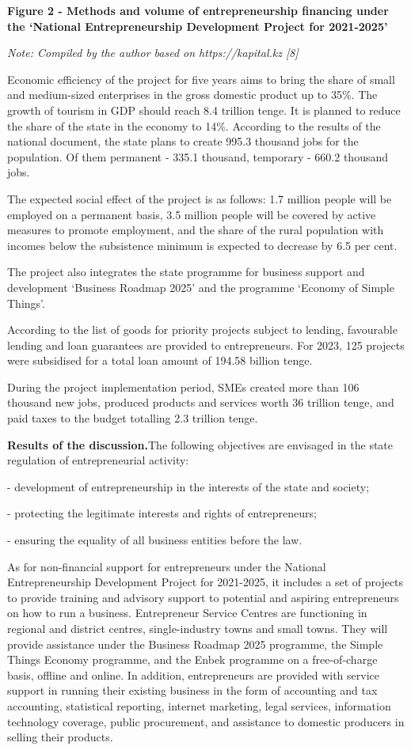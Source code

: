 {\bfseries Figure 2 - Methods and volume of entrepreneurship financing
under the `National Entrepreneurship Development Project for 2021-2025'}

\emph{Note: Compiled by the author based on https://kapital.kz {[}8{]}}

Economic efficiency of the project for five years aims to bring the
share of small and medium-sized enterprises in the gross domestic
product up to 35\%. The growth of tourism in GDP should reach 8.4
trillion tenge. It is planned to reduce the share of the state in the
economy to 14\%. According to the results of the national document, the
state plans to create 995.3 thousand jobs for the population. Of them
permanent - 335.1 thousand, temporary - 660.2 thousand jobs.

The expected social effect of the project is as follows: 1.7 million
people will be employed on a permanent basis, 3.5 million people will be
covered by active measures to promote employment, and the share of the
rural population with incomes below the subsistence minimum is expected
to decrease by 6.5 per cent.

The project also integrates the state programme for business support and
development `Business Roadmap 2025' and the programme `Economy of Simple
Things'.

According to the list of goods for priority projects subject to lending,
favourable lending and loan guarantees are provided to entrepreneurs.
For 2023, 125 projects were subsidised for a total loan amount of 194.58
billion tenge.

During the project implementation period, SMEs created more than 106
thousand new jobs, produced products and services worth 36 trillion
tenge, and paid taxes to the budget totalling 2.3 trillion tenge.

{\bfseries Results of the discussion.}The following objectives are
envisaged in the state regulation of entrepreneurial activity:

- development of entrepreneurship in the interests of the state and
society;

- protecting the legitimate interests and rights of entrepreneurs;

- ensuring the equality of all business entities before the law.

As for non-financial support for entrepreneurs under the National
Entrepreneurship Development Project for 2021-2025, it includes a set of
projects to provide training and advisory support to potential and
aspiring entrepreneurs on how to run a business. Entrepreneur Service
Centres are functioning in regional and district centres,
single-industry towns and small towns. They will provide assistance
under the Business Roadmap 2025 programme, the Simple Things Economy
programme, and the Enbek programme on a free-of-charge basis, offline
and online. In addition, entrepreneurs are provided with service support
in running their existing business in the form of accounting and tax
accounting, statistical reporting, internet marketing, legal services,
information technology coverage, public procurement, and assistance to
domestic producers in selling their products.

